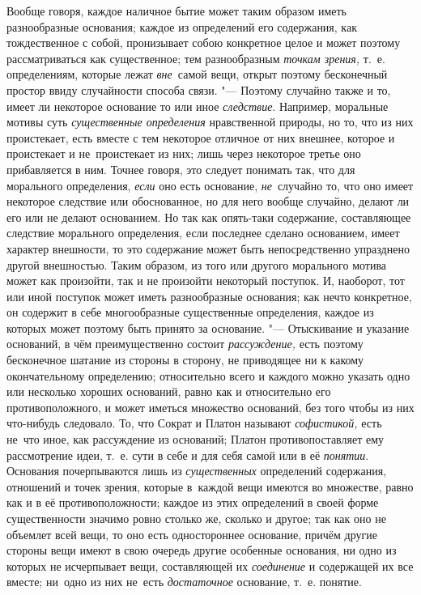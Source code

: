 Вообще говоря, каждое наличное бытие может таким образом иметь разнообразные
основания; каждое из определений его содержания, как тождественное с собой,
пронизывает собою конкретное целое и может поэтому рассматриваться как
существенное; тем разнообразным {\em точкам зрения,} т.~е. определениям,
которые лежат {\em вне}~самой вещи, открыт поэтому бесконечный простор ввиду
случайности способа связи. "--- Поэтому случайно также и то, имеет ли некоторое
основание то или иное {\em следствие}. Например, моральные мотивы суть
{\em существенные определения} нравственной природы, но то, что из них
проистекает, есть вместе с тем некоторое отличное от них внешнее, которое
и проистекает и не~проистекает из них; лишь через некоторое третье оно
прибавляется в ним. Точнее говоря, это следует понимать так, что для морального
определения, {\em если} оно есть основание, {\em не}~случайно то, что оно имеет
некоторое следствие или обоснованное, но для него вообще случайно, делают ли
его или не делают основанием. Но так как опять-таки содержание, составляющее
следствие морального определения, если последнее сделано основанием, имеет
характер внешности, то это содержание может быть непосредственно упразднено
другой внешностью. Таким образом, из того или другого морального мотива может
как произойти, так и не произойти некоторый поступок. И, наоборот, тот или иной
поступок может иметь разнообразные основания; как нечто конкретное, он содержит
в себе многообразные существенные определения, каждое из которых может поэтому
быть принято за основание. "--- Отыскивание и указание оснований, в чём
преимущественно состоит {\em рассуждение,} есть поэтому бесконечное шатание из
стороны в сторону, не приводящее ни к какому окончательному определению;
относительно всего и каждого можно указать одно или несколько хороших
оснований, равно как и относительно его противоположного, и может иметься
множество оснований, без того чтобы из них что-нибудь следовало. То, что Сократ
и Платон называют {\em софистикой,} есть не~что иное, как рассуждение из
оснований; Платон противопоставляет ему рассмотрение идеи, т.~е. сути в себе и
для себя самой или в её {\em понятии}. Основания почерпываются лишь из
{\em существенных} определений содержания, отношений и точек зрения, которые
в~каждой вещи имеются во множестве, равно как и в её противоположности; каждое
из этих определений в своей форме существенности значимо ровно столько же,
сколько и другое; так как оно не объемлет всей вещи, то оно есть одностороннее
основание, причём другие стороны вещи имеют в свою очередь другие особенные
основания, ни одно из которых не исчерпывает вещи, составляющей их
{\em соединение} и содержащей их все вместе; ни~одно из них не~есть
{\em достаточное} основание, т.~е. понятие.

